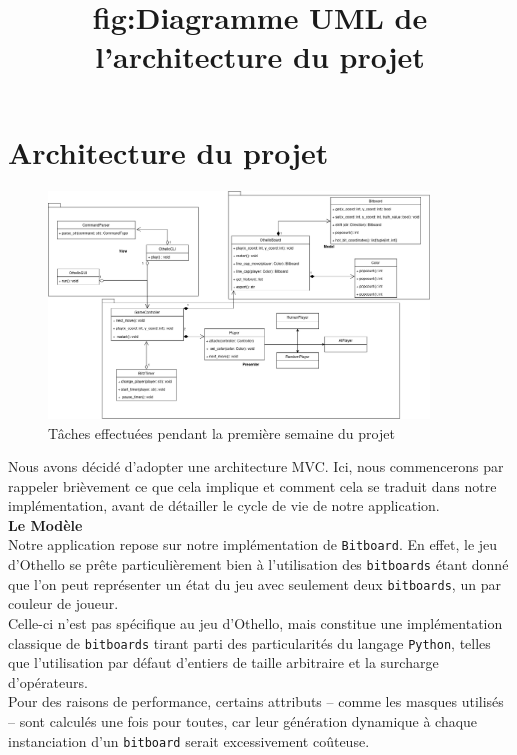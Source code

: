 \documentclass[a4paper,12pt]{article}
\begin{document}
\newpage

\section{Architecture du projet}

\begin{figure}[h]

    \vspace{3cm}

    \centering
    \includegraphics[width=0.9\textwidth]{images/diag_mvp.png}
    \caption{Tâches effectuées pendant la première semaine du projet}
    \title{fig:Diagramme UML de l'architecture du projet}

    \vspace{1cm}

\end{figure}

Nous avons décidé d’adopter une architecture MVC. Ici, nous commencerons par
rappeler brièvement ce que cela implique et comment cela se traduit dans notre
implémentation, avant de détailler le cycle de vie de notre application.\\

\textbf{Le Modèle}\\

Notre application repose sur notre implémentation de \texttt{Bitboard}. En
effet, le jeu d’Othello se prête particulièrement bien à l’utilisation des
\texttt{bitboards} étant donné que l’on peut représenter un état du jeu avec
seulement deux \texttt{bitboards}, un par couleur de joueur.\\ Celle-ci n’est
pas spécifique au jeu d’Othello, mais constitue une implémentation classique de
\texttt{bitboards} tirant parti des particularités du langage \texttt{Python},
telles que l’utilisation par défaut d’entiers de taille arbitraire et la
surcharge d’opérateurs.\\ Pour des raisons de performance, certains attributs
-- comme les masques utilisés -- sont calculés une fois pour toutes, car leur
génération dynamique à chaque instanciation d’un \texttt{bitboard} serait
excessivement coûteuse.\\
\end{document}
